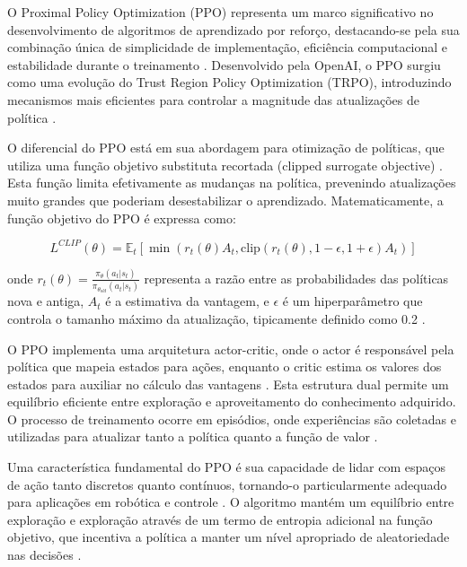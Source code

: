 O Proximal Policy Optimization (PPO) representa um marco significativo no desenvolvimento de algoritmos de aprendizado por reforço, destacando-se pela sua combinação única de simplicidade de implementação, eficiência computacional e estabilidade durante o treinamento \cite{https://arxiv.org/abs/1707.06347}. Desenvolvido pela OpenAI, o PPO surgiu como uma evolução do Trust Region Policy Optimization (TRPO), introduzindo mecanismos mais eficientes para controlar a magnitude das atualizações de política \cite{https://spinningup.openai.com/en/latest/algorithms/ppo.html}.

O diferencial do PPO está em sua abordagem para otimização de políticas, que utiliza uma função objetivo substituta recortada (clipped surrogate objective) \cite{https://www.datacamp.com/pt/tutorial/proximal-policy-optimization}. Esta função limita efetivamente as mudanças na política, prevenindo atualizações muito grandes que poderiam desestabilizar o aprendizado. Matematicamente, a função objetivo do PPO é expressa como:

\begin{equation}
L^{CLIP}(\theta) = \mathbb{E}_t \left[ \min\left( r_t(\theta) A_t, \text{clip}(r_t(\theta), 1-\epsilon, 1+\epsilon) A_t \right) \right]
\end{equation}

onde $r_t(\theta) = \frac{\pi_\theta(a_t|s_t)}{\pi_{\theta_{old}}(a_t|s_t)}$ representa a razão entre as probabilidades das políticas nova e antiga, $A_t$ é a estimativa da vantagem, e $\epsilon$ é um hiperparâmetro que controla o tamanho máximo da atualização, tipicamente definido como 0.2 \cite{https://iclr-blog-track.github.io/2022/03/25/ppo-implementation-details/}.

O PPO implementa uma arquitetura actor-critic, onde o actor é responsável pela política que mapeia estados para ações, enquanto o critic estima os valores dos estados para auxiliar no cálculo das vantagens \cite{https://pytorch.org/rl/main/tutorials/coding_ppo.html}. Esta estrutura dual permite um equilíbrio eficiente entre exploração e aproveitamento do conhecimento adquirido. O processo de treinamento ocorre em episódios, onde experiências são coletadas e utilizadas para atualizar tanto a política quanto a função de valor \cite{https://stable-baselines3.readthedocs.io/en/master/modules/ppo.html}.

Uma característica fundamental do PPO é sua capacidade de lidar com espaços de ação tanto discretos quanto contínuos, tornando-o particularmente adequado para aplicações em robótica e controle \cite{https://petmec.uff.br/wp-content/uploads/sites/288/2021/09/Mexas_TCC2.pdf}. O algoritmo mantém um equilíbrio entre exploração e exploração através de um termo de entropia adicional na função objetivo, que incentiva a política a manter um nível apropriado de aleatoriedade nas decisões \cite{https://www.toolify.ai/pt/ai-news-pt/introduo-ao-proximal-policy-optimization-ppo-no-aprendizado-profundo-por-reforo-1059924}.

